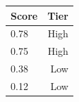 

\begin{tabular}{@{}lr@{}}
\toprule
Score & Tier \\
\midrule
0.78 & High \\
0.75 & High \\
0.38 & Low \\
0.12 & Low \\
\bottomrule
\end{tabular}